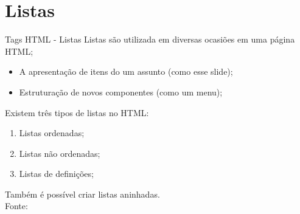 \documentclass{beamer}
\begin{document}
\section{Listas}
\begin{frame}{Tags HTML - Listas}
  Listas são utilizada em diversas ocasiões em uma página HTML;
  \begin{itemize}
   \item A apresentação de itens do um assunto (como esse slide);
   \item Estruturação de novos componentes (como um menu);
  \end{itemize}
   Existem três tipos de listas no HTML:
  \begin{enumerate}
   \item Listas ordenadas;
    \item Listas não ordenadas;
    \item Listas de definições;
 \end{enumerate}
 Também é possível criar listas aninhadas.\\
 \tiny{Fonte: \cite{miletto2014desenvolvimento}}
\end{frame}
\end{document}
